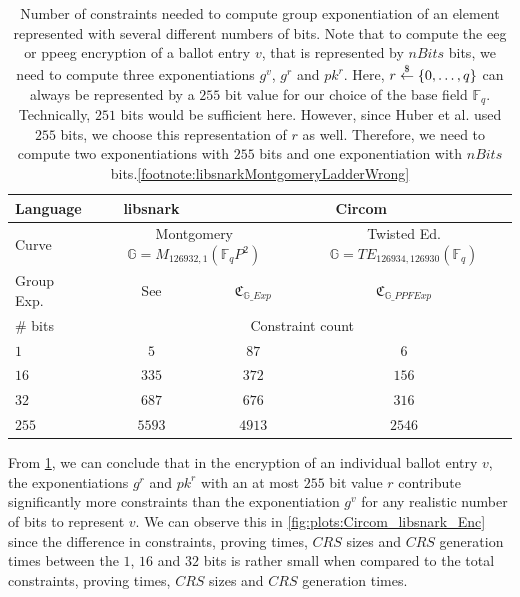 \begin{table}[h]
    \centering
    \begin{tabular}{|l|c|c|c|}
        \hline
        Language & libsnark & \multicolumn{2}{c|}{Circom}\\
        \hline
        Curve & \multicolumn{2}{c|}{Montgomery $\mathbb{G}=M_{126932, 1}(\mathbb{F}_qP^2)$} & Twisted Ed. $\mathbb{G}=TE_{126934, 126930}(\mathbb{F}_q)$\\
        \hline
        Group Exp. & See \cite{huber_zk-snarks_2025} & $\mathfrak{C}_{\mathbb{G}\_Exp}$ & $\mathfrak{C}_{\mathbb{G}\_PPFExp}$\\
        \hline
        \hline
        \# bits & \multicolumn{3}{c|}{Constraint count} \\
        \hline
        $1$  & $5$ & $87$ & $6$\\
        $16$ & $335$ & $372$ & $156$\\
        $32$ & $687$ & $676$ & $316$\\
        \hline
        $255$ & $5593$ & $4913$ & $2546$\\
        \hline
    \end{tabular}
    \caption{Number of constraints needed to compute group exponentiation of an element represented with several different numbers of bits. 
    Note that to compute the \gls{eeg} or \gls{ppeeg} encryption of a ballot entry $v$, that is represented by $nBits$ bits, we need to compute three exponentiations $g^v$, $g^r$ and $pk^r$.
    Here, $r\overset{\$}{\gets} \{0,\dots, q\}$ can always be represented by a $255$ bit value for our choice of the base field $\mathbb{F}_q$. 
    Technically, $251$ bits would be sufficient here.
    However, since Huber et al. used $255$ bits, we choose this representation of $r$ as well.
    Therefore, we need to compute two exponentiations with $255$ bits and one exponentiation with $nBits$ bits.\cref{footnote:libsnarkMontgomeryLadderWrong}
    }
    \label{tab:theoreticalConstraintCounts}
\end{table}

From \cref{tab:theoreticalConstraintCounts}, we can conclude that in the encryption of an individual ballot entry $v$, the exponentiations $g^r$ and $pk^r$ with an at most $255$ bit value $r$ contribute significantly more constraints than the exponentiation $g^v$ for any realistic number of bits to represent $v$.
We can observe this in \cref{fig:plots:Circom_libsnark_Enc} since the difference in constraints, proving times, $CRS$ sizes and $CRS$ generation times between the $1$, $16$ and $32$ bits is rather small when compared to the total constraints, proving times, $CRS$ sizes and $CRS$ generation times.

